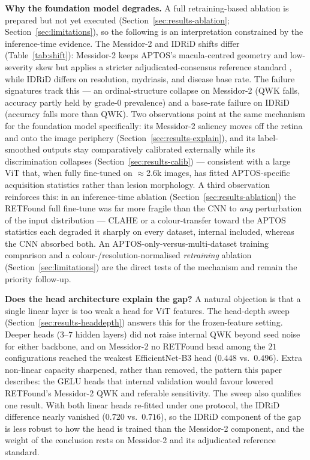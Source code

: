 \documentclass[journal]{IEEEtran}
\renewcommand{\_}{\origunderscore\allowbreak}
\begin{document}
\textbf{Why the foundation model degrades.} A full retraining-based ablation is
prepared but not yet executed (Section~\ref{sec:results-ablation};
Section~\ref{sec:limitations}), so the following is an interpretation
constrained by the inference-time evidence. The Messidor-2 and IDRiD shifts differ
(Table~\ref{tab:shift}): Messidor-2 keeps APTOS's macula-centred geometry and
low-severity skew but applies a stricter adjudicated-consensus reference standard
\cite{krause2018}, while IDRiD differs on resolution, mydriasis, and disease
base rate. The failure signatures track this --- an ordinal-structure collapse on
Messidor-2 (QWK falls, accuracy partly held by grade-0 prevalence) and a
base-rate failure on IDRiD (accuracy falls more than QWK). Two observations point
at the same mechanism for the foundation model specifically: its Messidor-2
saliency moves off the retina and onto the image periphery
(Section~\ref{sec:results-explain}), and its label-smoothed outputs stay
comparatively calibrated externally while its discrimination collapses
(Section~\ref{sec:results-calib}) --- consistent with a large ViT that, when fully
fine-tuned on $\approx$2.6k images, has fitted APTOS-specific acquisition
statistics rather than lesion morphology. A third observation reinforces this: in
an inference-time ablation (Section~\ref{sec:results-ablation}) the RETFound full
fine-tune was far more fragile than the CNN to \emph{any} perturbation of the
input distribution --- CLAHE or a colour-transfer toward the APTOS statistics
each degraded it sharply on every dataset, internal included, whereas the CNN
absorbed both. An APTOS-only-versus-multi-dataset training comparison and a
colour-/resolution-normalised \emph{retraining} ablation
(Section~\ref{sec:limitations}) are the direct tests of the mechanism and remain
the priority follow-up.

\textbf{Does the head architecture explain the gap?} A natural objection is that a single linear layer is too weak a head for ViT features. The head-depth sweep (Section~\ref{sec:results-headdepth}) answers this for the frozen-feature setting. Deeper heads ($3$--$7$ hidden layers) did not raise internal QWK beyond seed noise for either backbone, and on Messidor-2 no RETFound head among the $21$ configurations reached the weakest EfficientNet-B3 head ($0.448$ vs.\ $0.496$). Extra non-linear capacity sharpened, rather than removed, the pattern this paper describes: the GELU heads that internal validation would favour lowered RETFound's Messidor-2 QWK and referable sensitivity. The sweep also qualifies one result. With both linear heads re-fitted under one protocol, the IDRiD difference nearly vanished ($0.720$ vs.\ $0.716$), so the IDRiD component of the gap is less robust to how the head is trained than the Messidor-2 component, and the weight of the conclusion rests on Messidor-2 and its adjudicated reference standard.
\end{document}
